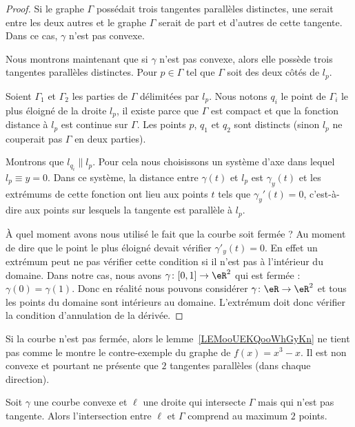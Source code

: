 \begin{proof}
	Si le graphe \( \Gamma\) possédait trois tangentes parallèles distinctes, une serait entre les deux autres et le graphe \( \Gamma\) serait de part et d'autres de cette tangente. Dans ce cas, \( \gamma\) n'est pas convexe.

	Nous montrons maintenant que si \( \gamma\) n'est pas convexe, alors elle possède trois tangentes parallèles distinctes. Pour \( p\in \Gamma\) tel que \( \Gamma\) soit des deux côtés de \( l_p\).

	Soient \( \Gamma_1\) et \( \Gamma_2\) les parties de \( \Gamma\) délimitées par \( l_p\). Nous notons \( q_i\) le point de \( \Gamma_i\) le plus éloigné de la droite \( l_p\), il existe parce que \( \Gamma\) est compact et que la fonction distance à \( l_p\) est continue sur \( \Gamma\). Les points \( p\), \( q_1\) et \( q_2\) sont distincts (sinon \( l_p\) ne couperait pas \( \Gamma\) en deux parties).

	Montrons que \( l_{q_i}\parallel l_p\). Pour cela nous choisissons un système d'axe dans lequel \( l_p\equiv y=0\). Dans ce système, la distance entre \( \gamma(t)\) et \( l_p\) est \( \gamma_y(t)\) et les extrémums de cette fonction ont lieu aux points \( t\) tels que \( \gamma_y'(t)=0\), c'est-à-dire aux points sur lesquels la tangente est parallèle à \( l_p\).

	À quel moment avons nous utilisé le fait que la courbe soit fermée ? Au moment de dire que le point le plus éloigné devait vérifier \( \gamma'_y(t)=0\). En effet un extrémum peut ne pas vérifier cette condition si il n'est pas à l'intérieur du domaine. Dans notre cas, nous avons \( \gamma\colon \mathopen[ 0 , 1 \mathclose]\to \eR^2\) qui est fermée :  \( \gamma(0)=\gamma(1)\). Donc en réalité nous pouvons considérer \( \gamma\colon \eR\to \eR^2\) et tous les points du domaine sont intérieurs au domaine. L'extrémum doit donc vérifier la condition d'annulation de la dérivée.
\end{proof}

\begin{example}
	Si la courbe n'est pas fermée, alors le lemme~\ref{LEMooUEKQooWhGyKn} ne tient pas comme le montre le contre-exemple du graphe de \( f(x)=x^3-x\). Il est non convexe et pourtant ne présente que \( 2\) tangentes parallèles (dans chaque direction).
\end{example}

\begin{lemma}       \label{LEMooCSXCooIDPiKW}
	Soit \( \gamma\) une courbe convexe et \( \ell\) une droite qui intersecte \( \Gamma\) mais qui n'est pas tangente. Alors l'intersection entre \( \ell\) et \( \Gamma\) comprend au maximum \( 2\) points.
\end{lemma}

